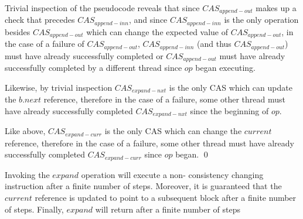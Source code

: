 \begin{prooftwo} Trivial inspection of the pseudocode reveals that since $CAS_{append-out}$
makes up a check that precedes $CAS_{append-inn}$, and since
$CAS_{append-inn}$ is the only operation besides $CAS_{append-out}$ which can
change the expected value of $CAS_{append-out}$, in the case of a failure of
$CAS_{append-out}$, $CAS_{append-inn}$ (and thus $CAS_{append-out}$) must have
already successfully completed or $CAS_{append-out}$ must have already
successfully completed by a different thread since $op$ began executing.

Likewise, by trivial inspection $CAS_{expand-nxt}$ is the only CAS which can
update the $b.next$ reference, therefore in the case of a failure, some other
thread must have already successfully completed $CAS_{expand-nxt}$ since the
beginning of $op$.

Like above, $CAS_{expand-curr}$ is the only CAS which can change the $current$
reference, therefore in the case of a failure, some other thread must have
already successfully completed $CAS_{expand-curr}$ since $op$ began.
\qed
\end{prooftwo}


\begin{lemmatwo}[Expand]\label{lemma-expand}
Invoking the $expand$ operation will execute a non- consistency changing
instruction after a finite number of steps. Moreover, it is guaranteed that
the $current$ reference is updated to point to a subsequent block after a
finite number of steps. Finally, $expand$ will return after a finite number of
steps
\end{lemmatwo}

